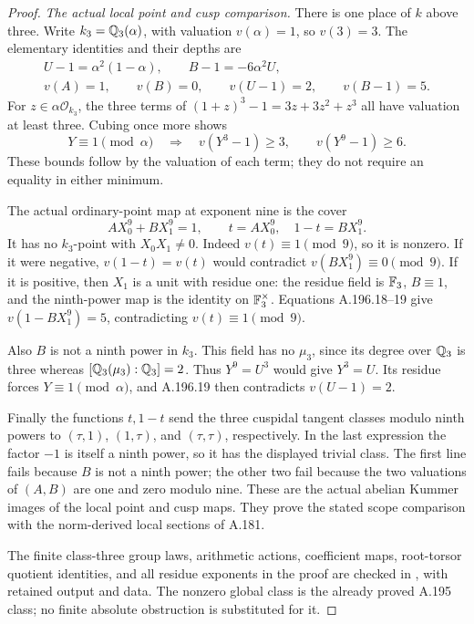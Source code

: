 \begin{proof}
\emph{The actual local point and cusp comparison.}
There is one place of \(k\) above three.  Write
\(k_3=\mathbb Q_3(\alpha)\), with valuation \(v(\alpha)=1\),
so \(v(3)=3\).  The elementary identities and their depths are
\[
\begin{gathered}
 U-1=\alpha^2(1-\alpha),\qquad
 B-1=-6\alpha^2U,\\
 v(A)=1,\qquad v(B)=0,\qquad
 v(U-1)=2,\qquad v(B-1)=5.
\end{gathered}
\tag{A.196.18}
\]
For \(z\in\alpha\mathcal O_{k_3}\), the three terms of
\((1+z)^3-1=3z+3z^2+z^3\) all have valuation at least
three.  Cubing once more shows
\[
 Y\equiv1\pmod\alpha\quad\Longrightarrow\quad
 v(Y^3-1)\ge3,\qquad v(Y^9-1)\ge6.
\tag{A.196.19}
\]
These bounds follow by the valuation of each term; they do
not require an equality in either minimum.

The actual ordinary-point map at exponent nine is the cover
\[
 A X_0^9+B X_1^9=1,\qquad
              t=A X_0^9,\quad 1-t=B X_1^9.
\tag{A.196.20}
\]
It has no \(k_3\)-point with \(X_0X_1\ne0\).
Indeed \(v(t)\equiv1\pmod9\), so it is nonzero.  If it
were negative, \(v(1-t)=v(t)\) would contradict
\(v(BX_1^9)\equiv0\pmod9\).  If it is positive, then
\(X_1\) is a unit with residue one: the residue field is
\(\mathbb F_3\), \(B\equiv1\), and the ninth-power map is the
identity on \(\mathbb F_3^\times\).  Equations A.196.18--19 give
\(v(1-BX_1^9)=5\), contradicting \(v(t)\equiv1\pmod9\).

Also \(B\) is not a ninth power in \(k_3\).  This field
has no \(\mu_3\), since its degree over \(\mathbb Q_3\) is
three whereas \([\mathbb Q_3(\mu_3):\mathbb Q_3]=2\).  Thus
\(Y^9=U^3\) would give \(Y^3=U\).  Its residue forces
\(Y\equiv1\pmod\alpha\), and A.196.19 then contradicts
\(v(U-1)=2\).

Finally the functions \(t,1-t\) send the three cuspidal
tangent classes modulo ninth powers to
\((\tau,1)\), \((1,\tau)\), and \((\tau,\tau)\),
respectively.  In the last expression the factor \(-1\)
is itself a ninth power, so it has the displayed trivial
class.  The first line fails because \(B\) is not a ninth
power; the other two fail because the two valuations of
\((A,B)\) are one and zero modulo nine.  These are the
actual abelian Kummer images of the local point and cusp
maps.  They prove the stated scope comparison with the
norm-derived local sections of A.181.

The finite class-three group laws, arithmetic actions,
coefficient maps, root-torsor quotient identities, and all
residue exponents in the proof are checked in
,
with retained output and data.  The nonzero global class is
the already proved A.195 class; no finite absolute obstruction
is substituted for it.
\end{proof}
